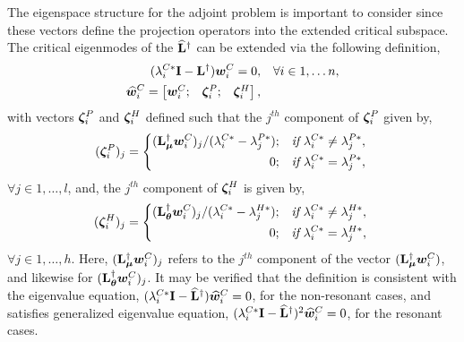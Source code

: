 The eigenspace structure for the adjoint problem is important to consider since these vectors define the projection operators into the extended critical subspace. The critical eigenmodes of the $\mathbf{\widehat{L}}^{\dagger}$ can be extended via the following definition,
\begin{subequations}
	\label{eqn:extended_adjoint_mode} 
	\begin{align}
		(\lambda^{C*}_{i}\mathbf{I} - \mathbf{L}^{\dagger})\boldsymbol{w}^{C}_{i} = 0, &&  \forall i \in 1,\ldots n, \\
		{\widehat{\boldsymbol{w}}}^{C}_{i} = \begin{bmatrix}
			\boldsymbol{w}^{C}_{i}; &
			\boldsymbol{\zeta}^{P}_{i}; &
			\boldsymbol{\zeta}^{H}_{i}
		\end{bmatrix}, && 
	\end{align}
\end{subequations}
with vectors $\boldsymbol{\zeta}^{P}_{i}$ and $\boldsymbol{\zeta}^{H}_{i}$ defined such that the $j^{th}$ component of  $\boldsymbol{\zeta}^{P}_{i}$ given by,
\begin{equation}
	\label{eqn:extended_resonant_adjoint_eigenvector1}
	\hspace{-1mm}(\boldsymbol{\zeta}^{P}_{i})_{j} = 
	\left\lbrace
	\begin{split}
		(\mathbf{L}_{\boldsymbol{\mu}}^{\dagger}\boldsymbol{w}^{C}_{i})_{j}/(\lambda^{C*}_{i} - \lambda^{P*}_{j}); && \textit{if}\ \lambda^{C*}_{i} \ne \lambda^{P*}_{j}, \\
		0;		&& \textit{if}\ \lambda^{C*}_{i} = \lambda^{P*}_{j},
	\end{split}\right.
\end{equation}
$\forall j\in 1,\ldots,l$, and, the $j^{th}$ component of $\boldsymbol{\zeta}^{H}_{i}$ is given by,
\begin{equation}
	\label{eqn:extended_resonant_adjoint_eigenvector2}
	\hspace{-1mm}(\boldsymbol{\zeta}^{H}_{i})_{j} =
	\left\lbrace
	\begin{split}
		(\mathbf{L}_{\boldsymbol{\theta}}^{\dagger}\boldsymbol{w}^{C}_{i})_{j}/(\lambda^{C*}_{i} - \lambda^{H*}_{j}); && \textit{if}\ \lambda^{C*}_{i} \ne \lambda^{H*}_{j}, \\
		0;		&& \textit{if}\ \lambda^{C*}_{i} = \lambda^{H*}_{j},
	\end{split}\right.
\end{equation}
$\forall j\in 1,\ldots,h$. Here, $(\mathbf{L}_{\boldsymbol{\mu}}^{\dagger}\boldsymbol{w}^{C}_{i})_{j}$ refers to the $j^{th}$ component of the vector $(\mathbf{L}_{\boldsymbol{\mu}}^{\dagger}\boldsymbol{w}^{C}_{i})$, and likewise for $(\mathbf{L}_{\boldsymbol{\theta}}^{\dagger}\boldsymbol{w}^{C}_{i})_{j}$. It may be verified that the definition is consistent with the eigenvalue equation, $(\lambda^{C*}_{i}\mathbf{I} - \mathbf{\widehat{L}}^{\dagger}){\widehat{\boldsymbol{w}}}^{C}_{i} = 0$, for the non-resonant cases, and satisfies generalized eigenvalue equation, $(\lambda^{C*}_{i}\mathbf{I} - \mathbf{\widehat{L}}^{\dagger})^{2}{\widehat{\boldsymbol{w}}}^{C}_{i} = 0$, for the resonant cases. 

